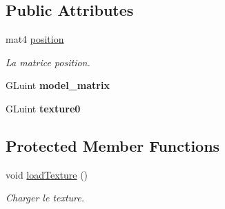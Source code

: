 \subsection*{Public Attributes}
\begin{DoxyCompactItemize}
\item 
\mbox{\label{classMoon_a7043b55afc82c6a304088589cae86797}} 
mat4 \mbox{\hyperlink{classMoon_a7043b55afc82c6a304088589cae86797}{position}}
\begin{DoxyCompactList}\small\item\em La matrice position. \end{DoxyCompactList}\item 
\mbox{\label{classMoon_aad7e347135d0205c3a104447824525bf}} 
G\+Luint {\bfseries model\+\_\+matrix}
\item 
\mbox{\label{classMoon_a58f1198c91451ce5753faee9ea555117}} 
G\+Luint {\bfseries texture0}
\end{DoxyCompactItemize}
\subsection*{Protected Member Functions}
\begin{DoxyCompactItemize}
\item 
void \mbox{\hyperlink{classMoon_afa96a9eb248c138bbb808e68a54b426c}{load\+Texture}} ()
\begin{DoxyCompactList}\small\item\em Charger le texture. \end{DoxyCompactList}\end{DoxyCompactItemize}
